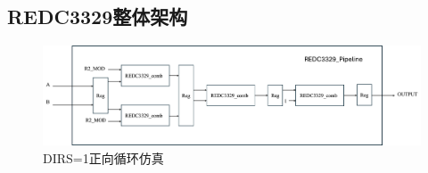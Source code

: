 \documentclass[UTF8]{ctexart}
\begin{document}
\subsection{REDC3329整体架构}
\begin{figure}[h]
	\centering
	\includegraphics[scale=0.4]{1.png}
	\caption{DIRS=1正向循环仿真}	
\end{figure}

\end{document}
